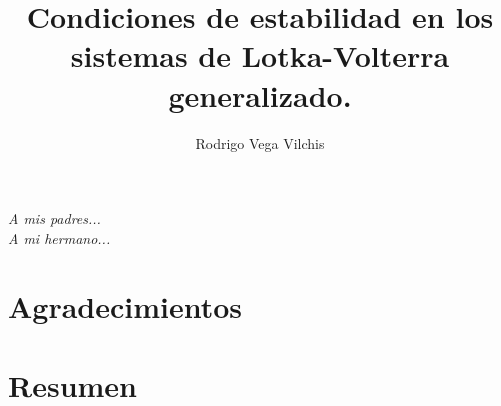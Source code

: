 \documentclass[a4paper,11pt]{book}
\author{Rodrigo Vega Vilchis}
\title{Condiciones de estabilidad en los sistemas de Lotka-Volterra generalizado.}
\theoremstyle{plain}
\theoremstyle{definition}
\begin{document}
\frontmatter
\maketitle

\begin{flushright}%
	\emph{A mis padres...}\\
	\emph{A mi hermano...}
	\thispagestyle{empty}
\end{flushright}

\chapter{Agradecimientos}

\chapter{Resumen}

\tableofcontents
\listoffigures
\listofalgorithms


%

\mainmatter

%
%





\backmatter
\printbibliography
%
\end{document}
